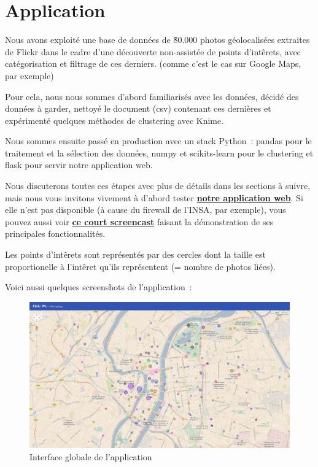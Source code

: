\chapter{Application}

    Nous avons exploité une base de données de \~80.000 photos géolocalisées extraites de Flickr dans le cadre d'une découverte
    non-assistée de points d'intêrets, avec catégorisation et filtrage de ces derniers. (comme c'est le cas sur Google Maps, par exemple)

    Pour cela, nous nous sommes d'abord familiarisés avec les données, décidé des données à garder, nettoyé le document (csv) contenant ces dernières et expérimenté quelques méthodes de clustering avec Knime.

    Nous sommes ensuite passé en production avec un stack Python~: pandas pour le traitement et la sélection des données, numpy et scikits-learn pour le clustering et flask pour servir notre application web.

    Nous discuterons toutes ces étapes avec plus de détails dans les sections à suivre, mais nous vous invitons vivement à d'abord
    tester \href{http://188.226.171.22:5000}{\textbf{notre application web}}. Si elle n'est pas disponible (à cause du firewall de
    l'INSA, par exemple), vous pouvez aussi voir \href{http://www.youtube.com/watch?v=SGGsvbjWYY0}{\textbf{ce court screencast}} faisant la démonstration de ses principales fonctionnalités.

    Les points d'intêrets sont représentés par des cercles dont la taille est proportionelle à l'intêret qu'ils représentent (= nombre de photos liées).

    Voici aussi quelques screenshots de l'application~:

    \begin{figure}[H]
        \centering
        \includegraphics[scale=0.25]{../screenshots/ui-global.png}
        \caption{Interface globale de l'application}
        \label{diagram:ui-global}
    \end{figure}


